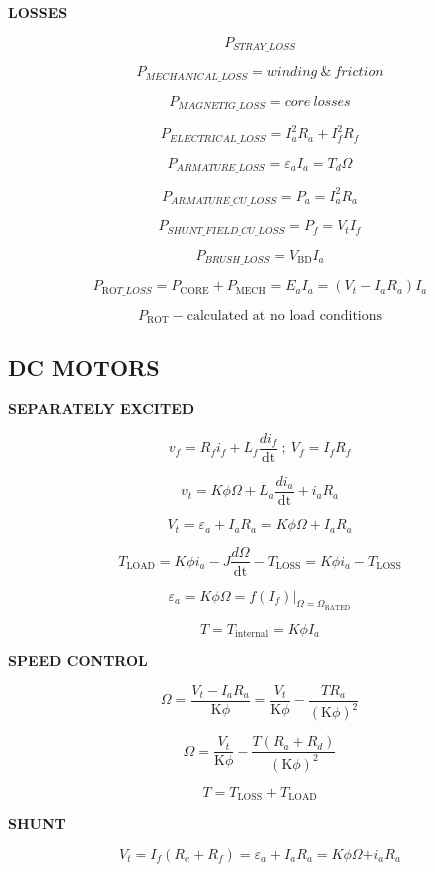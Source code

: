 \begin{multicols}{2}
	\textbf{LOSSES}
	
	\[P_{STRAY\_ LOSS}\]
	
	\[P_{MECHANICAL\_ LOSS} = winding\ \&\ friction\]
	
	\[P_{MAGNETIG\_ LOSS} = core\ losses\]
	
	\[P_{ELECTRICAL\_ LOSS} = I_{a}^{2}R_{a} + I_{f}^{2}R_{f}\]
	
	\[P_{ARMATURE\_ LOSS} = \varepsilon_{a}I_{a} = T_{d}\Omega\]
	
	\[P_{ARMATURE\_ CU\_ LOSS} = P_{a} = I_{a}^{2}R_{a}\]
	
	\[P_{SHUNT\_ FIELD\_ CU\_ LOSS} = P_{f} = V_{t}I_{f}\]
	
	\[P_{BRUSH\_ LOSS} = V_{\text{BD}}I_{a}\]
	
	\[P_{\text{RO}T\_ LOSS} = P_{\text{CORE}} + P_{\text{MECH}} = E_{a}I_{a} = (V_{t} - I_{a}R_{a})I_{a}\]
	
	\[P_{\text{ROT}} - \text{calculated\ at\ no\ load\ conditions}\]
	
	\subsection{DC MOTORS}
	
	\textbf{SEPARATELY EXCITED}
	
	\[v_{f} = R_{f}i_{f} + L_{f}\frac{di_{f}}{\text{dt}}\ ;\ V_{f} = I_{f}R_{f}\]
	
	\[v_{t} = K\phi\Omega + L_{a}\frac{di_{a}}{\text{dt}} + i_{a}R_{a}\]
	
	\[V_{t} = \varepsilon_{a} + I_{a}R_{a} = K\phi\Omega + I_{a}R_{a}\]
	
	\[T_{\text{LOAD}} = K\phi i_{a} - J\frac{d\Omega}{\text{dt}} - T_{\text{LOSS}} = K\phi i_{a} - T_{\text{LOSS}}\]
	
	\[\varepsilon_{a} = K\phi\Omega = f\left( I_{f} \right)|_{\Omega = \Omega_{\text{RATED}}}\]
	
	\[T = T_{\text{internal}} = K\phi I_{a}\]
	
	\textbf{SPEED CONTROL}
	
	\[\Omega = \frac{V_{t} - I_{a}R_{a}}{\text{K}\phi} = \frac{V_{t}}{\text{K}\phi} - \frac{TR_{a}}{\left( \text{K}\phi \right)^{2}}\]
	
	\[\Omega = \frac{V_{t}}{\text{K}\phi} - \frac{T(R_{a} + R_{d})}{\left( \text{K}\phi \right)^{2}}\]
	
	\[T = T_{\text{LOSS}} + T_{\text{LOAD}}\]
	
	\textbf{SHUNT}
	
	\[V_{t} = I_{f}\left( R_{e} + R_{f} \right) = \varepsilon_{a} + I_{a}R_{a} = K\phi\Omega{+ i}_{a}R_{a}\]
	

\end{multicols}

